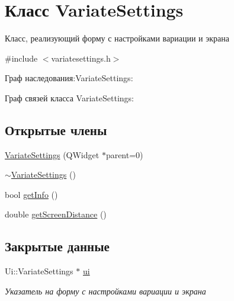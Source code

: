 \hypertarget{class_variate_settings}{}\section{Класс Variate\+Settings}
\label{class_variate_settings}


Класс, реализующий форму с настройками вариации и экрана  




{\ttfamily \#include $<$variatesettings.\+h$>$}



Граф наследования\+:Variate\+Settings\+:


Граф связей класса Variate\+Settings\+:
\subsection*{Открытые члены}
\begin{DoxyCompactItemize}
\item 
\mbox{\hyperlink{class_variate_settings_a8bf7d8b1de5d49503c4dd63f70bed391}{Variate\+Settings}} (Q\+Widget $\ast$parent=0)
\item 
\mbox{\hyperlink{class_variate_settings_aaf7b11850687596d1b2dc5acc63a8e8b}{$\sim$\+Variate\+Settings}} ()
\item 
bool \mbox{\hyperlink{class_variate_settings_a9c5e8f6c8cd83075bf9c71af36bebfa2}{get\+Info}} ()
\item 
double \mbox{\hyperlink{class_variate_settings_a7d21b9005c53002e522cf84bc2695d45}{get\+Screen\+Distance}} ()
\end{DoxyCompactItemize}
\subsection*{Закрытые данные}
\begin{DoxyCompactItemize}
\item 
\mbox{\label{class_variate_settings_a7d68b7eba563d2e282f8f3c1eb83a126}} 
Ui\+::\+Variate\+Settings $\ast$ \mbox{\hyperlink{class_variate_settings_a7d68b7eba563d2e282f8f3c1eb83a126}{ui}}
\begin{DoxyCompactList}\small\item\em Указатель на форму с настройками вариации и экрана \end{DoxyCompactList}\end{DoxyCompactItemize}



